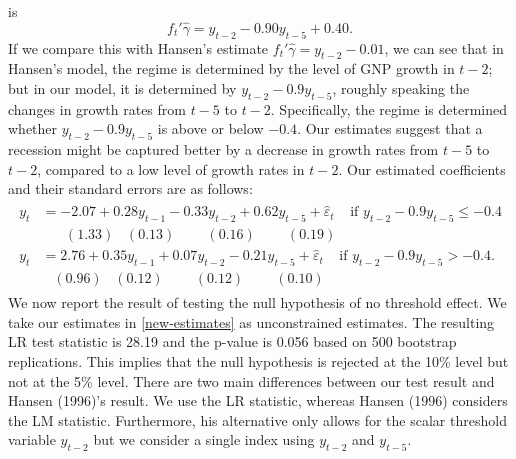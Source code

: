 \documentclass[12pt, reqno]{amsart}
\begin{document}
is 
\[
f_t'\widehat{\gamma} = y_{t-2} - 0.90 y_{t-5}  + 0.40. 
\]
If we compare this with Hansen's estimate $f_t'\widehat{\gamma} =  y_{t-2} - 0.01$, we can see that in Hansen's model, the regime is determined by the level of GNP growth in $t-2$; but in our model, it is determined by $y_{t-2} - 0.9 y_{t-5}$, roughly speaking the changes in growth rates from $t-5$ to $t-2$. Specifically, the regime is determined whether $y_{t-2} - 0.9 y_{t-5}$ is  above or below $- 0.4$.  
Our estimates suggest that a recession might be captured better by a decrease in growth rates from $t-5$ to $t-2$, compared to a low level of growth rates in $t-2$. Our estimated coefficients and their standard errors are as follows:
\begin{align}\label{new-estimates}
\begin{split}
y_t &=  - 2.07 + 0.28 y_{t-1} - 0.33 y_{t-2} + 0.62 y_{t-5} + \widehat{\varepsilon}_t    \;\;\;\; \text{if $y_{t-2} - 0.9 y_{t-5} \leq -0.4$} \\
      &   \;\;\;\;\;\; (1.33) \;\;\; (0.13)   \;\;\;\;\;\;\;\; (0.16)   \;\;\;\;\;\;\;\; (0.19)     \\
y_t &=  2.76 + 0.35 y_{t-1} + 0.07 y_{t-2} - 0.21 y_{t-5} + \widehat{\varepsilon}_t    \;\;\;\; \text{if $y_{t-2} - 0.9 y_{t-5} > -0.4$.}  \\
      &   \;\;\; (0.96) \;\;\; (0.12)   \;\;\;\;\;\;\;\; (0.12)   \;\;\;\;\;\;\;\; (0.10)    
\end{split}
\end{align}
We now report the result of testing the null hypothesis of no threshold effect.  We take our estimates in \eqref{new-estimates} as unconstrained estimates. The resulting LR test statistic is 28.19 and the p-value is 0.056 based on 500 bootstrap replications. This implies that the null hypothesis is rejected at the 10\% level but not at the 5\% level. There are two main differences between our test result and Hansen (1996)'s result. We use the LR statistic, whereas Hansen (1996) considers the LM statistic. Furthermore, his alternative only allows for the scalar threshold variable $y_{t-2}$ but we consider a single index using $y_{t-2}$ and $y_{t-5}$. 
\end{document}
